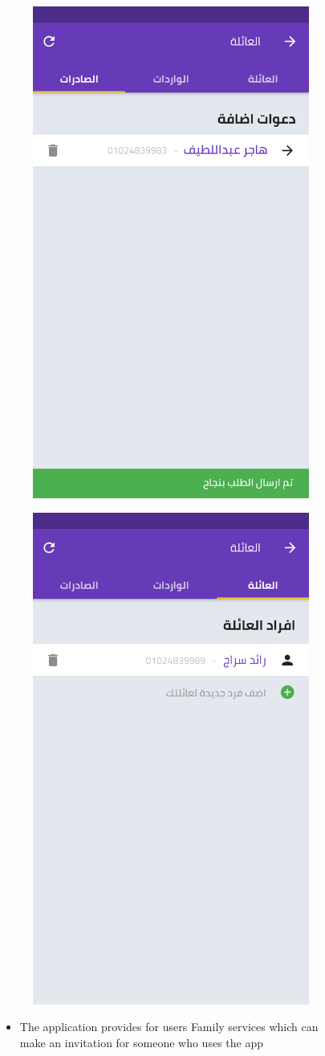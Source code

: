 \begin{figure}[H] 
  
    \begin{subfigure}[b]{0.5\linewidth}
    \centering
    \includegraphics[width=0.5\linewidth]{images/ch3/family/6.png}
  
  \end{subfigure}%
    \begin{subfigure}[b]{0.5\linewidth}
    \centering
    \includegraphics[width=0.5\linewidth]{images/ch3/family/7.png}
  
  \end{subfigure}%
  \par\par
  \begin{itemize}
  \item The application provides for users Family services which can make an invitation for someone who uses the app
\end{itemize}


  
  \label{fig7} 
\end{figure}
